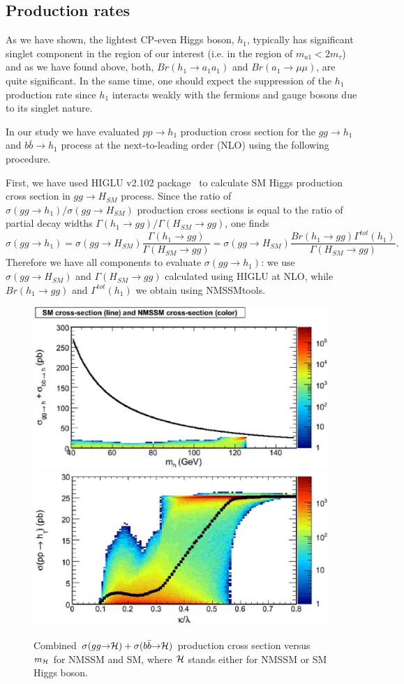 \documentclass[aps,12pt,superscriptaddress,nofootinbib,floatfix,showpacs]{revtex4}
\begin{document}
\subsection{Production rates}

As we have shown,
the lightest CP-even Higgs boson, $h_1$,
typically has significant singlet component
in the region of our  interest 
(i.e. in the region of $m_{a1}<2 m_{\tau}$) 
and as we have found above,
both, $Br(h_1\to a_1 a_1)$  and $Br(a_1\to \mu\mu)$,
are quite significant. In the same time,
one should expect the suppression
of the $h_1$ production rate since $h_1$ interacts weakly with the 
fermions and gauge bosons  due to its  singlet nature.

In our study we have evaluated $pp\to h_1$ production cross section
for the $gg\to h_1$ and $b\bar{b}\to h_1$ process
at the next-to-leading order (NLO)
using the following 
procedure.

First, we have used  
HIGLU v2.102 package~\cite{Spira:1995rr} to calculate 
SM Higgs production cross section in $gg\to H_{SM}$ process.
Since the ratio of  $\sigma(gg\to h_1)/\sigma(gg\to H_{SM})$
production cross sections is equal to the ratio
of partial decay widths $\Gamma(h_1\to gg)/\Gamma(H_{SM}\to gg)$, one finds
\begin{equation}
\sigma(gg\to h_1)=\sigma(gg\to H_{SM})\frac{\Gamma(h_1\to gg)}{\Gamma(H_{SM}\to gg)}
=\sigma(gg\to H_{SM})\frac{Br(h_1\to gg)\Gamma^{tot}(h_1)}{\Gamma(H_{SM}\to gg)}.
\end{equation}
Therefore we have all components to evaluate $\sigma(gg\to h_1)$:
we use
$\sigma(gg\to H_{SM})$ and $\Gamma(H_{SM}\to gg)$ calculated  using HIGLU at  NLO,
while $Br(h_1\to gg)$ and $\Gamma^{tot}(h_1)$ we obtain using NMSSMtools.


\begin{figure}[htb]
\includegraphics[width=0.5\linewidth]{plots/cs3.eps}%
\includegraphics[width=0.5\linewidth]{plots/sig_vs_kaplam.eps}%
\caption{Combined 
$\sigma(gg\to {\cal H}) + \sigma(b\bar{b}\to {\cal H})$ production cross section
versus $m_{\cal H}$ for NMSSM and SM,
where ${\cal H}$ stands either for NMSSM or SM Higgs boson.
\label{cs3}}
\end{figure}
\end{document}

